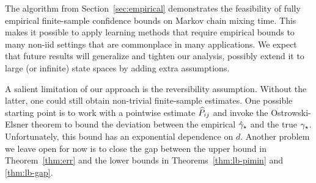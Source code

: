 
The algorithm from Section~\ref{sec:empirical} demonstrates the
feasibility of fully empirical finite-sample confidence bounds on
Markov chain mixing time.
This makes it possible to apply learning methods that require
empirical bounds to many non-iid settings that are commonplace in many
applications.
We expect that future results will generalize and tighten our
analysis, possibly extend it to large (or infinite) state spaces by
adding extra assumptions.

A salient limitation of our approach is the reversibility assumption.
Without the latter, one could still obtain non-trivial finite-sample
estimates.
One possible starting point is to work with a pointwise estimate $\widehat
P_{ij}$ and invoke the Ostrowski-Elsner theorem
\citep{stewart1990matrix} to bound the deviation between the empirical
$\hat\gamma_{\star}$ and the true $\gamma_{\star}$.
Unfortunately, this bound has an exponential dependence on $d$.
Another problem we leave open for now is to close the gap between the
upper bound in Theorem~\ref{thm:err} and the lower bounds in
Theorems~\ref{thm:lb-pimin} and \ref{thm:lb-gap}. 


